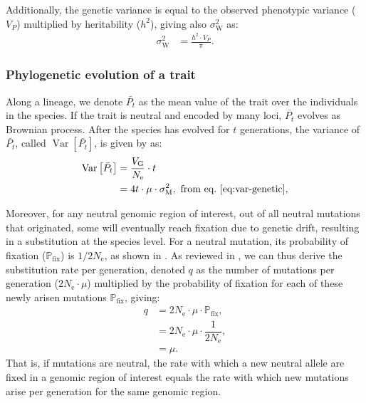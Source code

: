 \documentclass{article}
\newcommand{\Multiply}{\cdot}
\DeclareMathOperator{\Var}{\text{Var}}
\newcommand{\Ne}{N_{\text{e}}}
\newcommand{\proba}{\mathbb{P}}
\newcommand{\pfix}{\proba_{\text{fix}}}
\newcommand{\Time}{t}
\newcommand{\Trait}{P}
\newcommand{\Heredity}{h^2}
\newcommand{\MeanTrait}{\bar{\Trait_{\Time}}}
\newcommand{\VarPhy}{\Var \left[\MeanTrait\right]}
\newcommand{\MutationRate}{\mu}
\newcommand{\SubRate}{q}
\newcommand{\VarPhenotype}{V_{\Trait}}
\newcommand{\VarGenetic}{V_{\mathrm{G}}}
\newcommand{\RateMut}{\sigma^2_{\mathrm{M}}}
\newcommand{\RatePop}{\sigma^2_{\mathrm{W}}}
\begin{document}
Additionally, the genetic variance is equal to the observed phenotypic variance ($\VarPhenotype$) multiplied by heritability ($\Heredity$), giving also $\RatePop$ as:
\begin{align}
    \RatePop & = \frac{\Heredity \Multiply \VarPhenotype }{\pi }. \label{eq:rate-pheno-pop}
\end{align}

\subsubsection{Phylogenetic evolution of a trait}

Along a lineage, we denote $\MeanTrait$ as the mean value of the trait over the individuals in the species.
If the trait is neutral and encoded by many loci, $\MeanTrait$ evolves as Brownian process\cite{hansen_translating_1996}.
After the species has evolved for $\Time$ generations, the variance of $\MeanTrait$, called $\VarPhy$, is given by \textcite{hansen_translating_1996} as:
\begin{align}
    \VarPhy & = \frac{\VarGenetic}{\Ne} \Multiply \Time \\
    & = 4 \Time \Multiply \MutationRate \Multiply \RateMut \label{eq:covar},\text{ from eq.~\ref{eq:var-genetic}},
\end{align}

Moreover, for any neutral genomic region of interest, out of all neutral mutations that originated, some will eventually reach fixation due to genetic drift, resulting in a substitution at the species level.
For a neutral mutation, its probability of fixation ($\pfix$) is $1/2\Ne$, as shown in \textcite{kimura_probability_1962}.
As reviewed in \textcite{mccandlish_modeling_2014}, we can thus derive the substitution rate per generation, denoted $\SubRate$ as the number of mutations per generation ($2\Ne \Multiply \MutationRate$) multiplied by the probability of fixation for each of these newly arisen mutations $\pfix$, giving:
\begin{align}
    \SubRate & = 2 \Ne \Multiply \MutationRate \Multiply \pfix, \\
    & = 2 \Ne  \Multiply \MutationRate  \Multiply \dfrac{1}{2\Ne}, \\
    & = \MutationRate. \label{eq:substitution-rate}
\end{align}
That is, if mutations are neutral, the rate with which a new neutral allele are fixed in a genomic region of interest equals the rate with which new mutations arise per generation for the same genomic region\cite{kimura_evolutionary_1968}.
\end{document}

